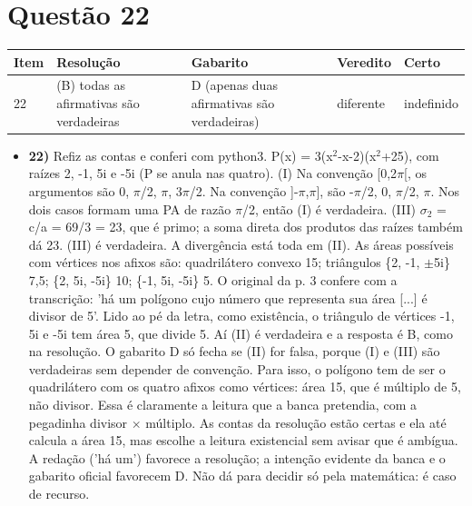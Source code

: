 \documentclass{article}%
\begin{document}
\section*{Questão 22}%
\begin{longtable}{@{}p{} p{} p{} p{} p{}@{}}\toprule Item & Resolução & Gabarito & Veredito & Certo \\ \midrule
22 & (B) todas as afirmativas são verdadeiras & D (apenas duas afirmativas são verdadeiras) & diferente & indefinido \\
\bottomrule\end{longtable}%
\begin{itemize}%
\item%
\textbf{22)} Refiz as contas e conferi com python3. P(x) = 3(x$^2$-x-2)(x$^2$+25), com raízes 2, -1, 5i e -5i (P se anula nas quatro). (I) Na convenção {[}0,2$\pi${[}, os argumentos são 0, $\pi$/2, $\pi$, 3$\pi$/2. Na convenção {]}-$\pi$,$\pi${]}, são -$\pi$/2, 0, $\pi$/2, $\pi$. Nos dois casos formam uma PA de razão $\pi$/2, então (I) é verdadeira. (III) $\sigma$$_{2}$ = c/a = 69/3 = 23, que é primo; a soma direta dos produtos das raízes também dá 23. (III) é verdadeira. A divergência está toda em (II). As áreas possíveis com vértices nos afixos são: quadrilátero convexo 15; triângulos \{2, -1, $\pm$5i\} 7,5; \{2, 5i, -5i\} 10; \{-1, 5i, -5i\} 5. O original da p. 3 confere com a transcrição: 'há um polígono cujo número que representa sua área {[}...{]} é divisor de 5'. Lido ao pé da letra, como existência, o triângulo de vértices -1, 5i e -5i tem área 5, que divide 5. Aí (II) é verdadeira e a resposta é B, como na resolução. O gabarito D só fecha se (II) for falsa, porque (I) e (III) são verdadeiras sem depender de convenção. Para isso, o polígono tem de ser o quadrilátero com os quatro afixos como vértices: área 15, que é múltiplo de 5, não divisor. Essa é claramente a leitura que a banca pretendia, com a pegadinha divisor $\times$ múltiplo. As contas da resolução estão certas e ela até calcula a área 15, mas escolhe a leitura existencial sem avisar que é ambígua. A redação ('há um') favorece a resolução; a intenção evidente da banca e o gabarito oficial favorecem D. Não dá para decidir só pela matemática: é caso de recurso.%
\end{itemize}%
\end{document}
